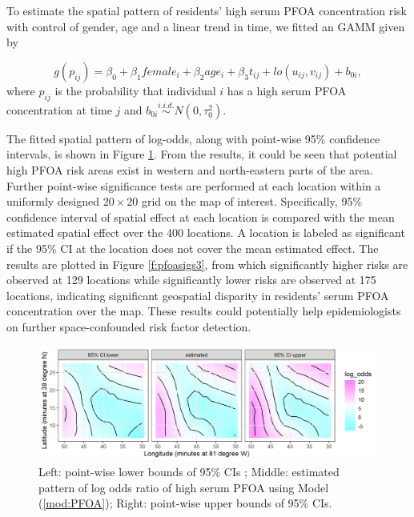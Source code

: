 	To estimate the spatial pattern of residents' high serum PFOA concentration risk with control of gender, age and a linear trend in time, we fitted an GAMM given by 
	
	\begin{equation}\label{mod:PFOA}
	g(p_{ij}) = \beta_0 + \beta_1 female_i + \beta_2 age_i + \beta_3 t_{ij} + lo(u_{ij}, v_{ij}) +  b_{0i}, 
	\end{equation}
	where $p_{ij}$ is the probability that individual $i$ has a high serum PFOA concentration at time $j$ and $b_{0i} \stackrel{i.i.d.}{\sim} N(0,\tau_0^2)$. 
	
	The fitted spatial pattern of log-odds, along with point-wise 95\% confidence intervals, is shown in Figure \ref{f:pfoaplotsGAMM}. From the results, it could be seen that potential high PFOA risk areas exist in western and north-eastern parts of the area. Further point-wise significance tests are performed at each location within a uniformly designed $20\times 20$ grid on the map of interest. Specifically, 95\% confidence interval of spatial effect at each location is compared with the mean estimated spatial effect over the 400 locations. A location is labeled as significant if the 95\% CI at the location does not cover the mean estimated effect. The results are plotted in Figure \ref{f:pfoasigs3}, from which significantly higher risks are observed at 129 locations while significantly lower risks are observed at 175 locations, indicating significant geospatial disparity in residents' serum PFOA concentration over the map. These results could potentially help epidemiologists on further space-confounded risk factor detection. 
	
	
	\begin{figure}[h]
		\begin{center}
			\includegraphics[width=\linewidth]{Figures/Chap5/Ests3.png}
		\end{center}
		\caption{Left: point-wise lower bounds of 95\% CIs ; Middle: estimated pattern of log odds ratio of high serum PFOA using Model (\ref{mod:PFOA}); Right: point-wise upper bounds of 95\% CIs.}
		\label{f:pfoaplotsGAMM}
	\end{figure}
	
